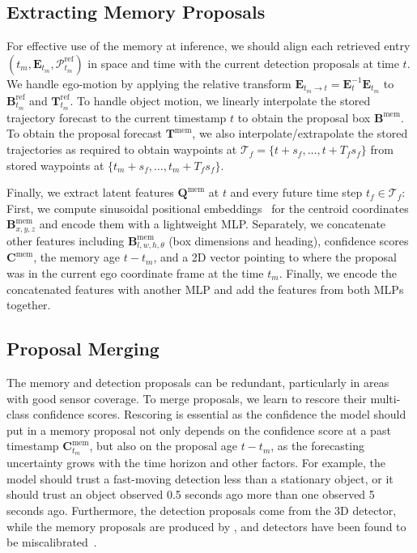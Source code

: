 \subsection{Extracting Memory Proposals}
For effective use of the memory at inference,
we should align each retrieved entry
$(t_m, \mathbf{E}_{t_m}, \mathcal{P}^{\mathrm{ref}}_{t_m})$
in space and time with the current detection proposals at time $t$.
We handle ego-motion by applying the relative transform
$\mathbf{E}_{t_m \to t} = \mathbf{E}_{t}^{-1} \mathbf{E}_{t_m}$
to $\mathbf{B}_{t_m}^{\mathrm{ref}}$ and $\mathbf{T}_{t_m}^{\mathrm{ref}}$.
To handle object motion, we linearly interpolate the stored trajectory forecast to the current timestamp $t$ to obtain the proposal box $\mathbf{B}^\mathrm{mem}$.
To obtain the proposal forecast $\mathbf{T}^\mathrm{mem}$,
we also interpolate/extrapolate the stored trajectories as required to obtain waypoints at $\mathcal{T}_f = \{t+s_f, \dots, t + T_f s_f\}$ from stored waypoints at $\{t_m+s_f, \dots, t_m + T_f s_f\}$.

Finally, we extract latent features $\mathbf{Q}^\mathrm{mem}$ at
$t$ and every future time step $t_f \in \mathcal{T}_f$:
First, we compute sinusoidal positional embeddings~\cite{vaswani2017attention}
for the centroid coordinates $\mathbf{B}^{\mathrm{mem}}_{x, y, z}$ and encode
them with a lightweight MLP.
Separately, we concatenate other features including
$\mathbf{B}^{\mathrm{mem}}_{l, w, h, \theta}$ (box dimensions and heading), confidence scores $\mathbf{C}^{\mathrm{mem}}$, the memory age $t - t_m$,
and a 2D vector pointing to where the proposal was in the current ego coordinate frame at the time $t_m$.
Finally, we encode the concatenated features with another MLP and add the features from both MLPs together.

\subsection{Proposal Merging} 
The memory and detection proposals can be redundant, particularly in areas with good sensor coverage. 
To merge proposals, we learn to rescore their multi-class confidence scores.
Rescoring is essential as the confidence the model should put in a memory proposal
not only depends on the confidence score at a past timestamp
$\mathbf{C}_{t_m}^\mathrm{mem}$, but also on the proposal age $t - t_m$, as the forecasting uncertainty grows with the time horizon and other factors.
For example, the model should trust a fast-moving detection less than a stationary object, or it should trust an object observed 0.5 seconds ago more than one observed 5 seconds ago.
Furthermore, the detection proposals come from the 3D detector, while the memory proposals are produced by \ourmodel{},
and detectors have been found to be miscalibrated~\cite{neumann2018relaxed,kuppers2020multivariate,minderer2021revisiting}.

